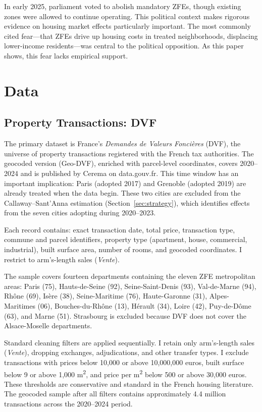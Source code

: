 \documentclass[12pt]{article}
\begin{document}
In early 2025, parliament voted to abolish mandatory ZFEs, though existing zones were allowed to continue operating. This political context makes rigorous evidence on housing market effects particularly important. The most commonly cited fear---that ZFEs drive up housing costs in treated neighborhoods, displacing lower-income residents---was central to the political opposition. As this paper shows, this fear lacks empirical support.


\section{Data} \label{sec:data}

\subsection{Property Transactions: DVF}

The primary dataset is France's \textit{Demandes de Valeurs Fonci\`eres} (DVF), the universe of property transactions registered with the French tax authorities. The geocoded version (Geo-DVF), enriched with parcel-level coordinates, covers 2020--2024 and is published by Cerema on data.gouv.fr. This time window has an important implication: Paris (adopted 2017) and Grenoble (adopted 2019) are already treated when the data begin. These two cities are excluded from the Callaway--Sant'Anna estimation (Section~\ref{sec:strategy}), which identifies effects from the seven cities adopting during 2020--2023.

Each record contains: exact transaction date, total price, transaction type, commune and parcel identifiers, property type (apartment, house, commercial, industrial), built surface area, number of rooms, and geocoded coordinates. I restrict to arm's-length sales (\textit{Vente}).

The sample covers fourteen departments containing the eleven ZFE metropolitan areas: Paris (75), Hauts-de-Seine (92), Seine-Saint-Denis (93), Val-de-Marne (94), Rh\^one (69), Is\`ere (38), Seine-Maritime (76), Haute-Garonne (31), Alpes-Maritimes (06), Bouches-du-Rh\^one (13), H\'erault (34), Loire (42), Puy-de-D\^ome (63), and Marne (51). Strasbourg is excluded because DVF does not cover the Alsace-Moselle departments.

Standard cleaning filters are applied sequentially. I retain only arm's-length sales (\textit{Vente}), dropping exchanges, adjudications, and other transfer types. I exclude transactions with prices below 10,000 or above 10,000,000 euros, built surface below 9 or above 1,000 m\textsuperscript{2}, and price per m\textsuperscript{2} below 500 or above 30,000 euros. These thresholds are conservative and standard in the French housing literature. The geocoded sample after all filters contains approximately 4.4 million transactions across the 2020--2024 period.
\end{document}
